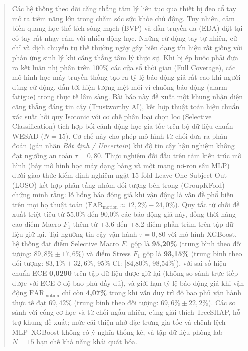\documentclass[conference]{IEEEtran}
\begin{document}
\begin{abstract}
Các hệ thống theo dõi căng thẳng tâm lý liên tục qua thiết bị đeo cổ tay mở ra tiềm năng lớn trong chăm sóc sức khỏe chủ động. Tuy nhiên, cảm biến quang học thể tích sóng mạch (BVP) và dẫn truyền da (EDA) đặt tại cổ tay rất nhạy cảm với nhiễu động học. Những cử động tay tự nhiên, cử chỉ và dịch chuyển tư thế thường ngày gây biến dạng tín hiệu rất giống với phản ứng sinh lý khi căng thẳng tâm lý thực sự. Khi bị ép buộc phải đưa ra kết luận nhị phân trên 100\% các cửa sổ thời gian (Full Coverage), các mô hình học máy truyền thống tạo ra tỷ lệ báo động giả rất cao khi người dùng cử động, dẫn tới hiện tượng mệt mỏi vì chuông báo động (alarm fatigue) trong thực tế lâm sàng. Bài báo này đề xuất một khung nhận diện căng thẳng đáng tin cậy (Trustworthy AI), kết hợp thuật toán hiệu chuẩn xác suất hồi quy Isotonic với cơ chế phân loại chọn lọc (Selective Classification) tích hợp bối cảnh động học gia tốc trên bộ dữ liệu chuẩn WESAD ($N=15$). Cơ chế này cho phép mô hình từ chối đưa ra phán đoán (gán nhãn \textit{Bất định / Uncertain}) khi độ tin cậy hậu nghiệm không đạt ngưỡng an toàn $\tau = 0,80$. Thực nghiệm đối đầu trên tám kiến trúc mô hình (bảy mô hình học máy dạng bảng và một mạng nơ-ron sâu MLP) dưới giao thức kiểm định nghiêm ngặt 15-fold Leave-One-Subject-Out (LOSO) kết hợp phân tầng nhóm đối tượng bên trong (GroupKFold) chứng minh rằng: lỗ hổng báo động giả khi vận động là vấn đề phổ biến trên mọi họ thuật toán ($\text{FAR}_{\text{motion}} \approx 12,2\% - 24,0\%$). Quy tắc từ chối đề xuất triệt tiêu từ 55,0\% đến 90,0\% các báo động giả này, đồng thời nâng cao điểm Macro $F_1$ thêm từ +3,6 đến +8,2 điểm phần trăm trên tập dữ liệu giữ lại. Tại ngưỡng tin cậy vận hành $\tau = 0,80$ với mô hình XGBoost, hệ thống đạt điểm Selective Macro $F_1$ gộp là \textbf{95,20\%} (trung bình theo đối tượng: $89,8\% \pm 17,6\%$) và điểm Stress $F_1$ gộp là \textbf{93,15\%} (trung bình theo đối tượng: $83,1\% \pm 32,6\%$, 95\% CI: [84,80\%, 98,54\%]), với sai số hiệu chuẩn ECE \textbf{0,0290} trên tập dữ liệu được giữ lại (không so sánh trực tiếp được với ECE ở độ bao phủ đầy đủ), và giới hạn tỷ lệ báo động giả khi vận động $\text{FAR}_{\text{motion}}$ chỉ còn \textbf{4,07\%} trong khi vẫn duy trì độ bao phủ vận hành thực tế đạt $69,42\%$ (trung bình theo đối tượng: $69,6\% \pm 22,2\%$). Các so sánh với cổng cơ học và từ chối ngẫu nhiên, cùng giải thích TreeSHAP, hỗ trợ khung đề xuất; mức cải thiện nhờ đặc trưng gia tốc và chênh lệch MLP--XGBoost không có ý nghĩa thống kê, và tập dữ liệu phòng lab $N=15$ hạn chế khả năng khái quát hóa.
\end{abstract}
\end{document}
